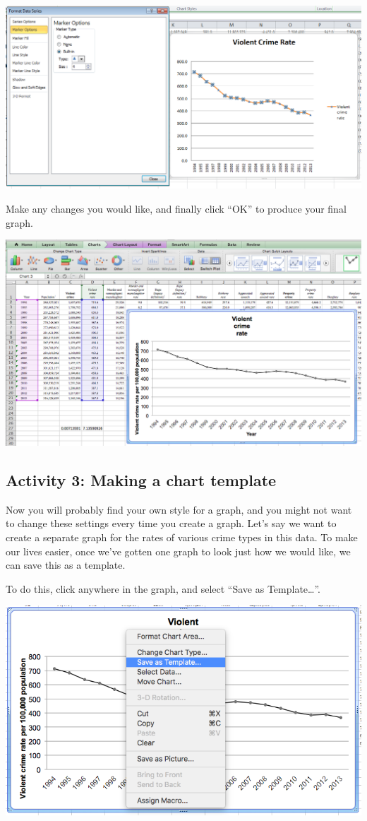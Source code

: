 \documentclass[]{book}
\theoremstyle{definition}
\theoremstyle{definition}
\theoremstyle{definition}
\theoremstyle{remark}
\begin{document}
\includegraphics{imgs/pc_edit_marker.png}

Make any changes you would like, and finally click ``OK'' to produce
your final graph.

\includegraphics{imgs/desc_line_final.png}

\hypertarget{activity-3-making-a-chart-template}{%
\subsection{Activity 3: Making a chart
template}\label{activity-3-making-a-chart-template}}

 Now you will probably find your own style for a graph, and you might
not want to change these settings every time you create a graph. Let's
say we want to create a separate graph for the rates of various crime
types in this data. To make our lives easier, once we've gotten one
graph to look just how we would like, we can save this as a template.

To do this, click anywhere in the graph, and select ``Save as
Template\ldots{}''.

\includegraphics{imgs/save_as_template.png}
\end{document}

